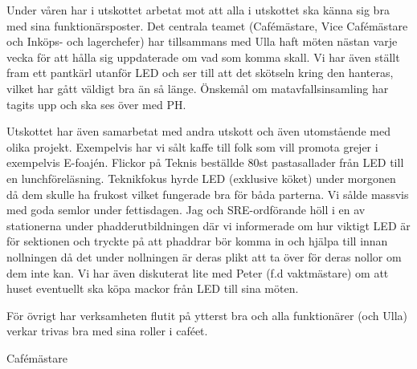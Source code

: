 \documentclass[../_main/handlingar.tex]{subfiles}
\begin{document}
Under våren har i utskottet arbetat mot att alla i utskottet ska känna sig bra med sina funktionärsposter. Det centrala teamet (Cafémästare, Vice Cafémästare och Inköps- och lagerchefer) har tillsammans med Ulla haft möten nästan varje vecka för att hålla sig uppdaterade om vad som komma skall. Vi har även ställt fram ett pantkärl utanför LED och ser till att det skötseln kring den hanteras, vilket har gått väldigt bra än så länge. Önskemål om matavfallsinsamling har tagits upp och ska ses över med PH.

Utskottet har även samarbetat med andra utskott och även utomstående med olika projekt. Exempelvis har vi sålt kaffe till folk som vill promota grejer i exempelvis E-foajén. Flickor på Teknis beställde 80st pastasallader från LED till en lunchföreläsning. Teknikfokus hyrde LED (exklusive köket) under morgonen då dem skulle ha frukost vilket fungerade bra för båda parterna. Vi sålde massvis med goda semlor under fettisdagen. Jag och SRE-ordförande höll i en av stationerna under phadderutbildningen där vi informerade om hur viktigt LED är för sektionen och tryckte på att phaddrar bör komma in och hjälpa till innan nollningen då det under nollningen är deras plikt att ta över för deras nollor om dem inte kan. Vi har även diskuterat lite med Peter (f.d vaktmästare) om att huset eventuellt ska köpa mackor från LED till sina möten.

För övrigt har verksamheten flutit på ytterst bra och alla funktionärer (och Ulla) verkar trivas bra med sina roller i caféet.

\begin{signatures}{1}
    \mvh
    \signature{Elin Johansson}{Cafémästare}
\end{signatures}
\end{document}
